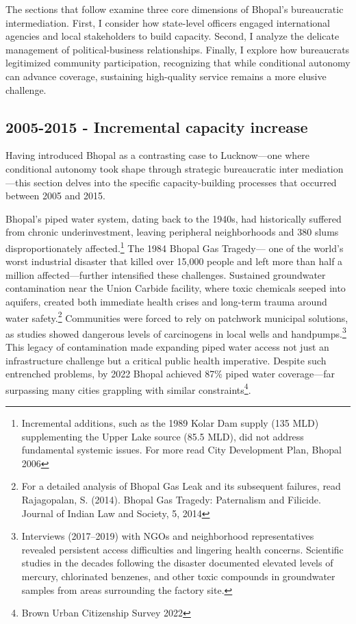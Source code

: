 The sections that follow examine three core dimensions of Bhopal’s bureaucratic intermediation. First, I consider how state-level officers engaged international agencies and local stakeholders to build capacity. Second, I analyze the delicate management of political-business relationships. Finally, I explore how bureaucrats legitimized community participation, recognizing that while conditional autonomy can advance coverage, sustaining high-quality service remains a more elusive challenge.

\subsection{2005-2015 - Incremental capacity increase }

Having introduced Bhopal as a contrasting case to Lucknow—one where conditional autonomy took shape through strategic bureaucratic inter mediation—this section delves into the specific capacity-building processes that occurred between 2005 and 2015. 

Bhopal's piped water system, dating back to the 1940s, had historically suffered from chronic underinvestment, leaving peripheral neighborhoods and 380 slums disproportionately affected.\footnote{Incremental additions, such as the 1989 Kolar Dam supply (135 MLD) supplementing the Upper Lake source (85.5 MLD), did not address fundamental systemic issues. For more read City Development Plan, Bhopal 2006} The 1984 Bhopal Gas Tragedy— one of the world's worst industrial disaster that killed over 15,000 people and left more than half a million affected—further intensified these challenges. Sustained groundwater contamination near the Union Carbide facility, where toxic chemicals seeped into aquifers, created both immediate health crises and long-term trauma around water safety.\footnote{For a detailed analysis of Bhopal Gas Leak and its subsequent failures, read {Rajagopalan, S. (2014). Bhopal Gas Tragedy: Paternalism and Filicide}. Journal of Indian Law and Society, 5, 2014}  Communities were forced to rely on patchwork municipal solutions, as studies showed dangerous levels of carcinogens in local wells and handpumps.\footnote{Interviews (2017–2019) with NGOs and neighborhood representatives revealed persistent access difficulties and lingering health concerns. Scientific studies in the decades following the disaster documented elevated levels of mercury, chlorinated benzenes, and other toxic compounds in groundwater samples from areas surrounding the factory site.} This legacy of contamination made expanding piped water access not just an infrastructure challenge but a critical public health imperative. Despite such entrenched problems, by 2022 Bhopal achieved 87\% piped water coverage—far surpassing many cities grappling with similar constraints\footnote{Brown Urban Citizenship Survey 2022}.

